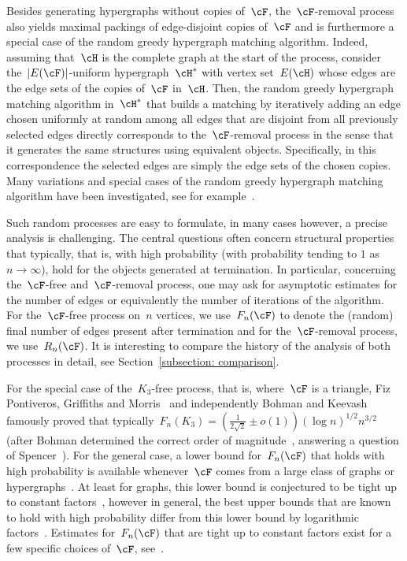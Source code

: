 \documentclass[11pt]{amsart}
\DeclarePairedDelimiter{\abs}{\lvert}{\rvert}
\theoremstyle{definition}
\numberwithin{equation}{section}
\begin{document}
	Besides generating hypergraphs without copies of~$\cF$, the~$\cF$-removal process also yields maximal packings of edge-disjoint copies of~$\cF$ and is furthermore a special case of the random greedy hypergraph matching algorithm.
	Indeed, assuming that~$\cH$ is the complete graph at the start of the process, consider the~$\abs{E(\cF)}$-uniform hypergraph~$\cH^*$ with vertex set~$E(\cH)$ whose edges are the edge sets of the copies of~$\cF$ in~$\cH$.
	Then, the random greedy hypergraph matching algorithm in~$\cH^*$ that builds a matching by iteratively adding an edge chosen uniformly at random among all edges that are disjoint from all previously selected edges directly corresponds to the~$\cF$-removal process in the sense that it generates the same structures using equivalent objects.
	Specifically, in this correspondence the selected edges are simply the edge sets of the chosen copies.
	Many variations and special cases of the random greedy hypergraph matching algorithm have been investigated, see for example~\cite{AKS:97,BB:19,BFL:15,GJKKL:24,G:97,RT:96,S:95,W:99}.
	
	Such random processes are easy to formulate, in many cases however, a precise analysis is challenging.
	The central questions often concern structural properties that typically, that is, with high probability (with probability tending to $1$ as $n\to \infty$), hold for the objects generated at termination.
	In particular, concerning the~$\cF$-free and~$\cF$-removal process, one may ask for asymptotic estimates for the number of edges or equivalently the number of iterations of the algorithm.
	For the~$\cF$-free process on~$n$ vertices, we use~$F_n(\cF)$ to denote the (random) final number of edges present after termination and for the~$\cF$-removal process, we use~$R_n(\cF)$.
	It is interesting to compare the history of the analysis of both processes in detail, see Section~\ref{subsection: comparison}.
		
	For the special case of the~$K_3$-free process, that is, where~$\cF$ is a triangle, Fiz Pontiveros, Griffiths and Morris~\cite{PGM:20} and independently Bohman and Keevash~\cite{BK:21} famously proved that typically~$F_n(K_3)=(\frac{1}{2\sqrt{2}}\pm o(1))(\log n)^{1/2}n^{3/2}$ (after Bohman determined the correct order of magnitude~\cite{B:09}, answering a question of Spencer~\cite{S:95b}).
	For the general case, a lower bound for~$F_n(\cF)$ that holds with high probability is available whenever~$\cF$ comes from a large class of graphs or hypergraphs~\cite{BB:16,BK:10}.
	At least for graphs, this lower bound is conjectured to be tight up to constant factors~\cite{BK:10}, however in general, the best upper bounds that are known to hold with high probability differ from this lower bound by logarithmic factors~\cite{KOT:16}.
	Estimates for~$F_n(\cF)$ that are tight up to constant factors exist for a few specific choices of~$\cF$, see~\cite{P:11,P:14a,P:14b,W:14a,W:14b}.
	
\end{document}

